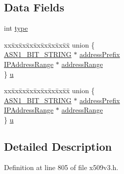 \subsection*{Data Fields}
\begin{DoxyCompactItemize}
\item 
int \hyperlink{struct_i_p_address_or_range__st_ac765329451135abec74c45e1897abf26}{type}
\item 
\begin{tabbing}
xx\=xx\=xx\=xx\=xx\=xx\=xx\=xx\=xx\=\kill
union \{\\
\>\hyperlink{crypto_2ossl__typ_8h_af837aaa00e151b1e8773aea5a8fe1cc4}{ASN1\_BIT\_STRING} $\ast$ \hyperlink{struct_i_p_address_or_range__st_a28e6168a5d8f5ffd6582f555b60aa7b2}{addressPrefix}\\
\>\hyperlink{crypto_2x509v3_2x509v3_8h_acd9fff8856d0a8fb205f7addda584a03}{IPAddressRange} $\ast$ \hyperlink{struct_i_p_address_or_range__st_a1da0c2774390b7bd7db8aef4792c56f2}{addressRange}\\
\} \hyperlink{struct_i_p_address_or_range__st_a70b7a72c9dce982667dbbf113b54e63a}{u}\\

\end{tabbing}\item 
\begin{tabbing}
xx\=xx\=xx\=xx\=xx\=xx\=xx\=xx\=xx\=\kill
union \{\\
\>\hyperlink{crypto_2ossl__typ_8h_af837aaa00e151b1e8773aea5a8fe1cc4}{ASN1\_BIT\_STRING} $\ast$ \hyperlink{struct_i_p_address_or_range__st_a28e6168a5d8f5ffd6582f555b60aa7b2}{addressPrefix}\\
\>\hyperlink{crypto_2x509v3_2x509v3_8h_acd9fff8856d0a8fb205f7addda584a03}{IPAddressRange} $\ast$ \hyperlink{struct_i_p_address_or_range__st_a1da0c2774390b7bd7db8aef4792c56f2}{addressRange}\\
\} \hyperlink{struct_i_p_address_or_range__st_a33b3008ea240f0619d17a5bd68957f90}{u}\\

\end{tabbing}\end{DoxyCompactItemize}


\subsection{Detailed Description}


Definition at line 805 of file x509v3.\+h.



